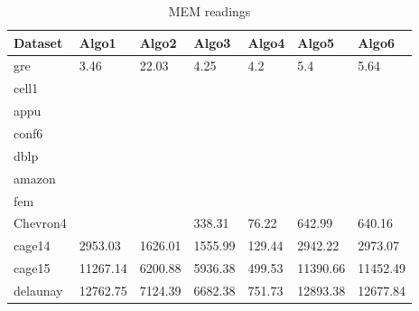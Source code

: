 

\begin{table}[th]
\begin{center}
    \begin{tabular}{| l | l | l | l | l | l | l |}
    \hline
	Dataset & Algo1 & Algo2 & Algo3 & Algo4 & Algo5 & Algo6\\ \hline
	gre & 3.46 & 22.03 & 4.25 & 4.2 & 5.4 & 5.64 \\ \hline
	cell1 &  &  &  &  &  & \\ \hline
	appu &  &  &  &  &  & \\ \hline
	conf6 &  &  &  &  &  & \\ \hline
	dblp &  &  &  &  &  & \\ \hline
	amazon &  &  &  &  &  & \\ \hline
	fem &  &  &  &  &  & \\ \hline
	Chevron4 &  &  & 338.31 & 76.22 & 642.99 & 640.16\\ \hline
	cage14 & 2953.03 & 1626.01 & 1555.99 & 129.44 & 2942.22 & 2973.07\\ \hline
	cage15 & 11267.14 & 6200.88 & 5936.38 & 499.53 & 11390.66 & 11452.49\\ \hline
	delaunay & 12762.75 & 7124.39 & 6682.38 & 751.73 & 12893.38 & 12677.84\\ \hline
    \hline
    \end{tabular}
\end{center}
\caption{\capfont MEM readings}
\label{tab:Table3}
\end{table}


